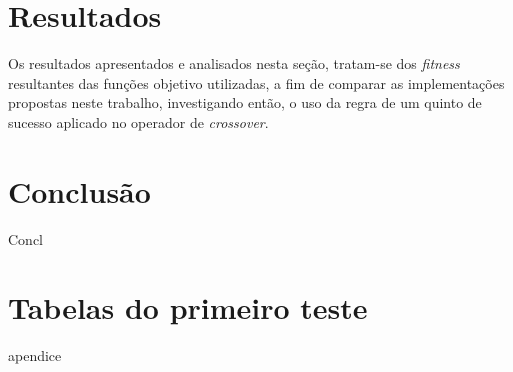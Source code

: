\documentclass[
    12pt,               %
    openright,          %
    oneside,
    a4paper,            %
    english,            %
    french,             %
    spanish,            %
    brazil              %
    ]{abntex2}
\begin{document}
\chapter{Resultados}
Os resultados apresentados e analisados nesta seção, tratam-se dos \textit{fitness} resultantes das funções objetivo utilizadas, a fim de comparar as implementações propostas neste trabalho, investigando então, o uso da regra de um quinto de sucesso aplicado no operador de \textit{crossover}. 



\chapter{Conclusão}

Concl

\postextual


%

\begin{apendicesenv}
\label{chap:apendices}

\partapendices

\chapter{Tabelas do primeiro teste}
apendice



\end{apendicesenv}
\end{document}
